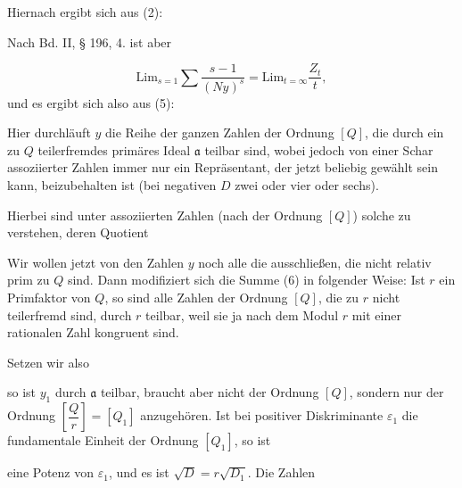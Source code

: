 
Hiernach ergibt sich aus (2):

Nach Bd. II, § 196, 4. ist aber

\[ \mathrm{Lim}_{s=1}\sum\frac{s-1}{(Ny)^s} = \mathrm{Lim}_{t=\infty}\frac{Z_t}{t}, \]
und es ergibt sich also aus (5):

Hier durchläuft $y$ die Reihe der ganzen Zahlen der Ordnung
$[Q]$, die durch ein zu $Q$ teilerfremdes primäres Ideal $\mathfrak{a}$ teilbar
sind, wobei jedoch von einer Schar assoziierter Zahlen immer
nur ein Repräsentant, der jetzt beliebig gewählt sein kann, beizubehalten
 ist (bei negativen $D$ zwei oder vier oder sechs).

Hierbei sind unter assoziierten Zahlen (nach der Ordnung
$[Q]$) solche zu verstehen, deren Quotient 

Wir wollen jetzt von den Zahlen $y$ noch alle die ausschließen,
die nicht relativ prim zu $Q$ sind. Dann modifiziert sich die
Summe (6) in folgender Weise: Ist $r$ ein Primfaktor von $Q$, so
sind alle Zahlen der Ordnung $[Q]$, die zu $r$ nicht teilerfremd
sind, durch $r$ teilbar, weil sie ja nach dem Modul $r$ mit einer
rationalen Zahl kongruent sind.

Setzen wir also

so ist $y_1$ durch $\mathfrak{a}$ teilbar, braucht aber nicht der Ordnung $[Q]$,
sondern nur der Ordnung $\left[\dfrac{Q}{r}\right] = [Q_1]$ anzugehören. Ist bei
positiver Diskriminante $\varepsilon_1$ die fundamentale Einheit der Ordnung
$[Q_1]$, so ist

eine Potenz von $\varepsilon_1$, und es ist $\sqrt D = r\sqrt{D_1}$. Die Zahlen

